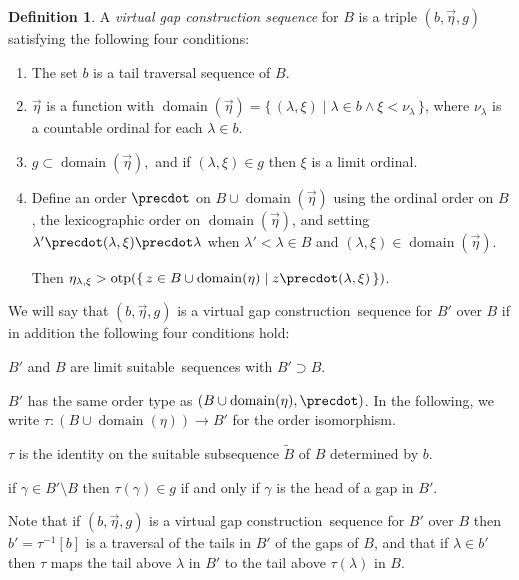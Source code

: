 \documentclass[
twoside,
]{article}
\newenvironment{myinparaenum}{\begin{inparaenum}[\upshape(i)]
}{\end{inparaenum}}
\theoremstyle{definition}
\newtheorem{definition}[theorem]{Definition}
\theoremstyle{remark}
\newcommand{\vg}{virtual gap construction}
\newcommand{\LS}{limit suitable}
\DeclareMathOperator{\otp}{otp}
\newcommand{\set}[1]{\{\,#1\,\}}
\DeclareMathOperator{\domain}{domain}
\begin{document}
\begin{definition}\label{def:vgsequence}
  A \emph{\vg{} sequence} for $B$ is a triple $(b, \vec\eta,g)$
  satisfying the following four conditions:
  \begin{enumerate}
  \item The set $b$ is a tail traversal sequence of $B$.
  \item $\vec\eta$ is a function with $\domain(\vec\eta)=
    \set{(\lambda,\xi)\mid \lambda\in b\land
      \xi<\nu_\lambda}$, where  $\nu_\lambda$ is a countable ordinal
    for each $\lambda\in b$.
  \item $g\subset\domain(\vec\eta),$ and if $(\lambda,\xi)\in g$ then
    $\xi$ is a limit ordinal.
  \item \label{item:vg_forcing}
    Define an order $\precdot$ on $B\cup\domain(\vec\eta)$ using the
    ordinal order on   $B$, the  lexicographic order on
    $\domain(\vec\eta)$, and setting 
    $\lambda'\precdot(\lambda,\xi)\precdot\lambda$ when $\lambda'<\lambda\in B$
    and $(\lambda,\xi)\in\domain( \vec\eta)$.

    Then $\eta_{\lambda,\xi}>\otp(\set{z\in B\cup\domain(\eta)\mid
      z\precdot(\lambda,\xi)})$.
  \end{enumerate}


  We will say that  $(b,\vec\eta,g)$ is a \vg\ sequence for $B'$ over  $B$
  if in addition the following four conditions hold:
  \begin{myinparaenum}
  \item 
    $B'$ and $B$ are \LS\ sequences with $B'\supset B$.
  \item\label{item:vgover-tauiso} $B'$ has the
    same order type as $(B\cup\domain(\eta),\precdot)$.   In the
    following, we write
    $\tau\colon (B\cup\domain(\eta))\to B'$ for  the order isomorphism. 
  \item\label{item:vgover-identity}
    $\tau$ is the identity on the suitable subsequence $\tilde B$ of
    $B$ determined by $b$.
  \item \label{item:vgover-gisright}
    if $\gamma\in B'\setminus B$ then $\tau(\gamma)\in g$ if and
    only if $\gamma$ is the head of a gap in $B'$.
  \end{myinparaenum}
\end{definition}
Note that if  $(b,\vec\eta,g)$ is a \vg\ sequence for $B'$ over  $B$
then $b'=\tau^{-1}[b]$ is a traversal of the
tails in $B'$ of the gaps of $B$, and that if $\lambda\in b'$ then
$\tau$ maps the tail above $\lambda$ in $B'$ to the tail above
$\tau(\lambda)$ in $B$. 
\end{document}
